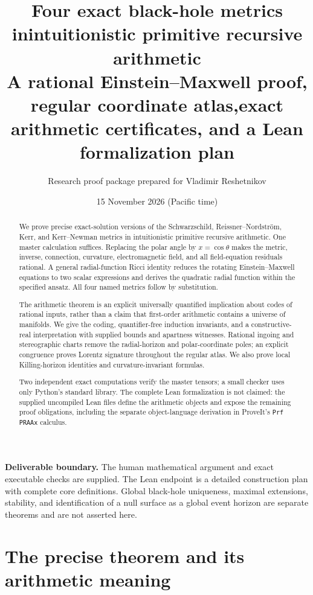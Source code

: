 \documentclass[11pt,a4paper]{article}
\title{\textbf{Four exact black-hole metrics in\newline intuitionistic primitive recursive arithmetic}\\[0.8em]\large A rational Einstein--Maxwell proof, regular coordinate atlas,\newline exact arithmetic certificates, and a Lean formalization plan}
\author{Research proof package prepared for Vladimir Reshetnikov}
\date{15 November 2026 (Pacific time)}
\numberwithin{equation}{section}
\theoremstyle{definition}\newtheorem{definition}[theorem]{Definition}
\theoremstyle{remark}\newtheorem{remark}[theorem]{Remark}
\begin{document}
\maketitle
\begin{abstract}
We prove precise exact-solution versions of the Schwarzschild, Reissner--Nordstr\"om, Kerr, and Kerr--Newman metrics in intuitionistic primitive recursive arithmetic. One master calculation suffices. Replacing the polar angle by $x=\cos\theta$ makes the metric, inverse, connection, curvature, electromagnetic field, and all field-equation residuals rational. A general radial-function Ricci identity reduces the rotating Einstein--Maxwell equations to two scalar expressions and derives the quadratic radial function within the specified ansatz. All four named metrics follow by substitution.

The arithmetic theorem is an explicit universally quantified implication about codes of rational inputs, rather than a claim that first-order arithmetic contains a universe of manifolds. We give the coding, quantifier-free induction invariants, and a constructive-real interpretation with supplied bounds and apartness witnesses. Rational ingoing and stereographic charts remove the radial-horizon and polar-coordinate poles; an explicit congruence proves Lorentz signature throughout the regular atlas. We also prove local Killing-horizon identities and curvature-invariant formulas.

Two independent exact computations verify the master tensors; a small checker uses only Python's standard library. The complete Lean formalization is not claimed: the supplied uncompiled Lean files define the arithmetic objects and expose the remaining proof obligations, including the separate object-language derivation in ProveIt's \texttt{Prf PRAAx} calculus.
\end{abstract}
\vspace{0.5em}
\noindent\textbf{Deliverable boundary.} The human mathematical argument and exact executable checks are supplied. The Lean endpoint is a detailed construction plan with complete core definitions. Global black-hole uniqueness, maximal extensions, stability, and identification of a null surface as a global event horizon are separate theorems and are not asserted here.
\clearpage
\tableofcontents
\clearpage

\section{The precise theorem and its arithmetic meaning}\label{sec:main}
\end{document}
